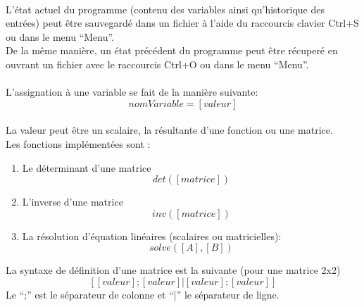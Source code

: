         \paragraph{}
            L'état actuel du programme (contenu des variables ainsi qu'historique des entrées) peut être sauvegardé dans un fichier à l'aide du raccourcis clavier Ctrl+S ou dans le menu ``Menu''.
            \\ De la même manière, un état précédent du programme peut être récuperé en ouvrant un fichier avec le raccourcis Ctrl+O ou dans le menu ``Menu''.

        \paragraph{}
            L'assignation à une variable se fait de la manière suivante: \[nomVariable = [valeur]\] 
            \\ La valeur peut être un scalaire, la résultante d'une fonction ou une matrice.
            \\ Les fonctions implémentées sont :
            \begin{enumerate}
                \item Le déterminant d'une matrice \[det([matrice])\]
                \item L'inverse d'une matrice \[inv([matrice])\]
                \item La résolution d'équation linéaires (scalaires ou matricielles): \[solve([A], [B])\] 
            \end{enumerate}
            La syntaxe de définition d'une matrice est la suivante (pour une matrice 2x2)
                \[ [ [valeur]; [valeur] | [valeur]; [valeur] ]\]
            Le ``;'' est le séparateur de colonne et ``|'' le séparateur de ligne.
